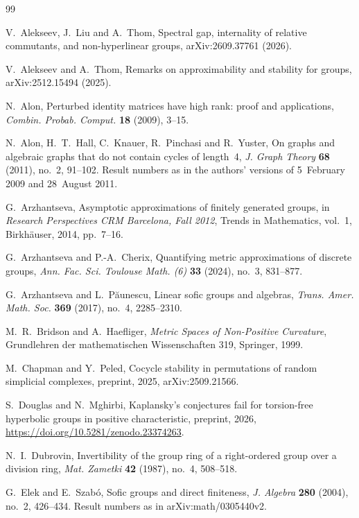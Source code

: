 \documentclass[11pt]{article}
\theoremstyle{definition}
\theoremstyle{remark}
\numberwithin{equation}{section}
\begin{document}
\begin{thebibliography}{99}
\raggedright

V.~Alekseev, J.~Liu and A.~Thom,
Spectral gap, internality of relative commutants, and non-hyperlinear groups,
arXiv:2609.37761 (2026).

V.~Alekseev and A.~Thom,
Remarks on approximability and stability for groups,
arXiv:2512.15494 (2025).

N.~Alon,
Perturbed identity matrices have high rank: proof and applications,
\emph{Combin. Probab. Comput.} \textbf{18} (2009), 3--15.

N.~Alon, H.~T.~Hall, C.~Knauer, R.~Pinchasi and R.~Yuster,
On graphs and algebraic graphs that do not contain cycles of length~4,
\emph{J. Graph Theory} \textbf{68} (2011), no.~2, 91--102. Result numbers as in the authors' versions of 5~February 2009 and 28~August 2011.

G.~Arzhantseva,
Asymptotic approximations of finitely generated groups,
in \emph{Research Perspectives CRM Barcelona, Fall 2012}, Trends in Mathematics, vol.~1, Birkh\"auser, 2014, pp.~7--16.

G.~Arzhantseva and P.-A.~Cherix,
Quantifying metric approximations of discrete groups,
\emph{Ann. Fac. Sci. Toulouse Math. (6)} \textbf{33} (2024), no.~3, 831--877.

G.~Arzhantseva and L.~P\u{a}unescu,
Linear sofic groups and algebras,
\emph{Trans. Amer. Math. Soc.} \textbf{369} (2017), no.~4, 2285--2310.

M.~R.~Bridson and A.~Haefliger,
\emph{Metric Spaces of Non-Positive Curvature},
Grundlehren der mathematischen Wissenschaften 319, Springer, 1999.

M.~Chapman and Y.~Peled,
Cocycle stability in permutations of random simplicial complexes,
preprint, 2025, arXiv:2509.21566.

S.~Douglas and N.~Mghirbi,
Kaplansky's conjectures fail for torsion-free hyperbolic groups in positive characteristic,
preprint, 2026, \url{https://doi.org/10.5281/zenodo.23374263}.

N.~I.~Dubrovin,
Invertibility of the group ring of a right-ordered group over a division ring,
\emph{Mat. Zametki} \textbf{42} (1987), no.~4, 508--518.

G.~Elek and E.~Szab\'o,
Sofic groups and direct finiteness,
\emph{J. Algebra} \textbf{280} (2004), no.~2, 426--434. Result numbers as in arXiv:math/0305440v2.


\end{thebibliography}
\end{document}
